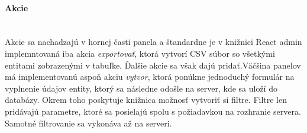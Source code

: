 \paragraph{Akcie}\leavevmode\\
Akcie sa nachadzajú v hornej časti panela a štandardne je v knižnici React admin implemntovaná iba
akcia \textit{exportovať}, ktorá vytvorí CSV súbor so všetkými entitami zobrazenými v tabuľke.
Ďalšie akcie sa však dajú pridať.Väčšina panelov má implementovanú aspoň akciu \textit{vytvor},
ktorá ponúkne jednoduchý formulár na vyplnenie údajov entity, ktorý sa následne odošle na server,
kde sa uloží do databázy. Okrem toho poskytuje knižnica možnosť vytvoriť si filtre. Filtre len
pridávajú parametre, ktoré sa posielajú spolu s požiadavkou na rozhranie servera. Samotné
filtrovanie sa vykonáva až na serveri. 

